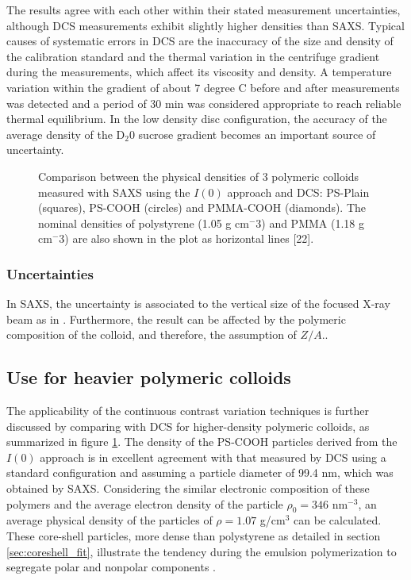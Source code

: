 The results agree with each other within their stated measurement uncertainties, although DCS measurements exhibit slightly higher densities than SAXS. Typical causes of systematic errors in DCS are the inaccuracy of the size and density of the calibration standard and the thermal variation in the centrifuge gradient during the measurements, which affect its viscosity and density\citep{kamiti_simultaneous_2012}. A temperature variation within the gradient of about 7 degree C before and after measurements was detected and a period of 30 min was considered appropriate to reach reliable thermal equilibrium. In the low density disc configuration, the accuracy of the average density of the D$_2$0 sucrose gradient becomes an important source of uncertainty.
\begin{figure}
	\begin{center}
		
	\end{center}
	\caption{Comparison between the physical densities of 3 polymeric colloids measured with SAXS using the $I(0)$ approach and DCS: PS-Plain (squares), PS-COOH (circles) and PMMA-COOH (diamonds). The nominal densities of polystyrene (1.05 g cm$^-3$) and PMMA (1.18 g cm$^-3$) are also shown in the plot as horizontal lines [22].}
	\label{fig:DensityComparison}
\end{figure}
\subsubsection{Uncertainties}
In SAXS, the uncertainty is associated to the vertical size of the focused X-ray beam as in \citep{garcia-diez_nanoparticle_2015}. Furthermore, the result can be affected by the polymeric composition of the colloid, and therefore, the assumption of $Z/A$..

\subsection{Use for heavier polymeric colloids}
The applicability of the continuous contrast variation techniques is further discussed by comparing with DCS for higher-density polymeric colloids, as summarized in figure \ref{fig:DensityComparison}. The density of the PS-COOH particles derived from the $I(0)$ approach is in excellent agreement with that measured by DCS using a standard configuration and assuming a particle diameter of 99.4 nm, which was obtained by SAXS. Considering the similar electronic composition of these polymers and the average electron density of the particle $\rho_0=346$ nm\(^{-3}\), an average physical density of the particles of $\rho=1.07$ g/cm\(^{3}\) can be calculated. These core-shell particles, more dense than polystyrene as detailed in section \ref{sec:coreshell_fit}, illustrate the tendency during the emulsion polymerization to segregate polar and nonpolar components \citep{dingenouts_structure_1994}.

